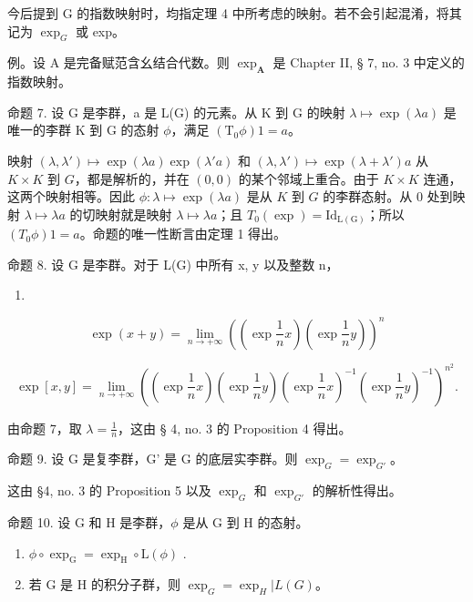 今后提到 G 的指数映射时，均指定理 4 中所考虑的映射。若不会引起混淆，将其记为 \(\exp_{G}\) 或 exp。

例。设 A 是完备赋范含幺结合代数。则 \(\exp_{\mathbf{A}}\) 是 Chapter II, § 7, no. 3 中定义的指数映射。

命题 7. 设 G 是李群，a 是 L(G) 的元素。从 K 到 G 的映射 \(\lambda \mapsto \exp(\lambda a)\) 是唯一的李群 K 到 G 的态射 \(\phi\)，满足 \((\mathrm{T}_0\phi)1 = a\)。

映射 \((\lambda, \lambda') \mapsto \exp(\lambda a) \exp(\lambda' a)\) 和 \((\lambda, \lambda') \mapsto \exp(\lambda + \lambda') a\) 从 \(K \times K\) 到 \(G\)，都是解析的，并在 \((0, 0)\) 的某个邻域上重合。由于 \(K \times K\) 连通，这两个映射相等。因此 \(\phi: \lambda \mapsto \exp(\lambda a)\) 是从 \(K\) 到 \(G\) 的李群态射。从 \(0\) 处到映射 \(\lambda \mapsto \lambda a\) 的切映射就是映射 \(\lambda \mapsto \lambda a\)；且 \(T_0(\exp) = \mathrm{Id}_{\mathrm{L}(\mathrm{G})}\)；所以 \((T_0\phi)1 = a\)。命题的唯一性断言由定理 1 得出。

命题 8. 设 G 是李群。对于 L(G) 中所有 x, y 以及整数 n，

\begin{enumerate}
\def\labelenumi{(\arabic{enumi})}
\setcounter{enumi}{1}
\tightlist
\item
\end{enumerate}

\[
\exp (x + y) = \lim _ {n \rightarrow + \infty} \left(\left(\exp \frac {1}{n} x\right)\left(\exp \frac {1}{n} y\right)\right) ^ {n}\tag{2}
\]

\[
\exp [ x, y ] = \lim _ {n \rightarrow + \infty} \left(\left(\exp \frac {1}{n} x\right)\left(\exp \frac {1}{n} y\right)\left(\exp \frac {1}{n} x\right) ^ {- 1} \left(\exp \frac {1}{n} y\right) ^ {- 1}\right) ^ {n ^ {2}}\tag{3}.
\]

由命题 7，取 \(\lambda = \frac{1}{n}\)，这由 § 4, no. 3 的 Proposition 4 得出。

命题 9. 设 G 是复李群，G' 是 G 的底层实李群。则 \(\exp_{G} = \exp_{G'}\)。

这由 §4, no. 3 的 Proposition 5 以及 \(\exp_{G}\) 和 \(\exp_{G'}\) 的解析性得出。

命题 10. 设 G 和 H 是李群，\(\phi\) 是从 G 到 H 的态射。

\begin{enumerate}
\def\labelenumi{(\roman{enumi})}
\item
  \(\phi \circ \exp_{\mathrm{G}} = \exp_{\mathrm{H}} \circ \mathrm{L}(\phi)\) .
\item
  若 G 是 H 的积分子群，则 \(\exp_{G} = \exp_{H} | L(G)\)。
\end{enumerate}

